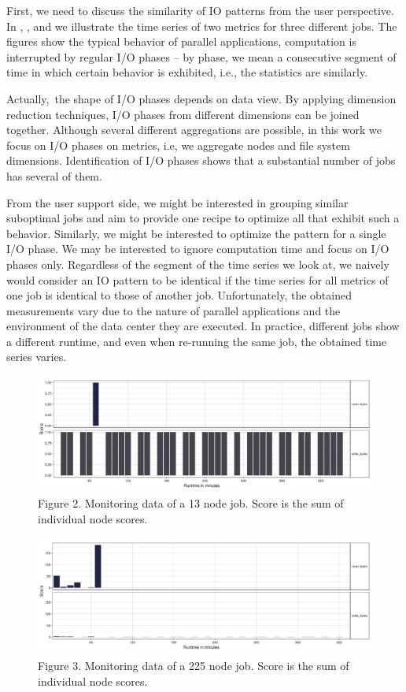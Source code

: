 \documentclass[]{llncs}
\begin{document}
First, we need to discuss the similarity of IO patterns from the user perspective.
In , , and  we illustrate the time series of two metrics for three different jobs.
The figures show the typical behavior of parallel applications, computation is interrupted by regular I/O phases – by phase, we mean a consecutive segment of time in which  certain behavior is exhibited, i.e., the statistics are similarly.

Actually,\ the shape of I/O phases depends on data view.
By applying dimension reduction techniques, I/O phases from different dimensions can be joined together.
Although several different aggregations are possible, in this work we focus on  I/O phases on metrics, i.e, we aggregate nodes and file system dimensions.
Identification of I/O phases shows that a substantial number of jobs has several of them.

From the user support side, we might be interested in grouping similar suboptimal jobs and aim to provide one recipe to optimize all that exhibit such a behavior.
Similarly, we might be interested to optimize the pattern for a single I/O phase.
We may be interested to ignore computation time and focus on I/O phases only.
Regardless of the segment of the time series we look at, we naively would consider an IO pattern to be identical if the time series for all metrics of one job is identical to those of another job.
Unfortunately, the obtained measurements vary due to the nature of parallel applications and the environment of the data center they are executed.
In practice, different jobs show a different runtime, and even when re-running the same job, the obtained time series varies.

\begin{figure}
	\centering
	 \includegraphics[width=4.61in,height=1.54in]{./media/image27.png}
	 \caption{Figure 2. Monitoring data of a 13 node job. Score is the sum of individual node scores.}
	 \label{fig:typ_io:1}
\end{figure}

\begin{figure}
	\centering
	 \includegraphics[width=4.61in,height=1.54in]{./media/image28.png}
	 \caption{Figure 3. Monitoring data of a 225 node job. Score is the sum of individual node scores.}
	 \label{fig:typ_io:2}
\end{figure}
\end{document}
